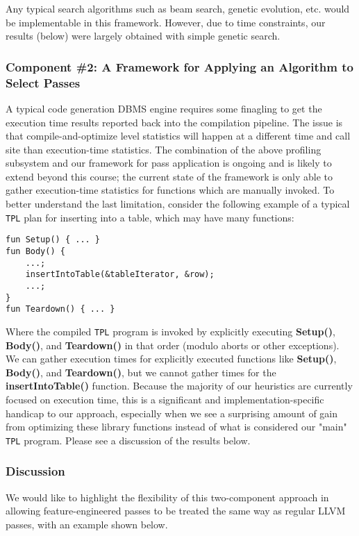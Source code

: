 \documentclass{vldb}
\newcommand{\tpl}{\texttt{TPL}\xspace}
\newcommand{\dbCode}[1]{{\sffamily\small \textbf{#1}}\xspace}
\begin{document}
Any typical search algorithms such as beam search, genetic evolution, etc. would be implementable in this framework. However, due to time constraints, our results (below) were largely obtained with simple genetic search.

\subsubsection{Component \#2: A Framework for Applying an Algorithm to Select Passes}

A typical code generation DBMS engine requires some finagling to get the execution time results reported back into the compilation pipeline. The issue is that compile-and-optimize level statistics will happen at a different time and call site than execution-time statistics. The combination of the above profiling subsystem and our framework for pass application is ongoing and is likely to extend beyond this course; the current state of the framework is only able to gather execution-time statistics for functions which are manually invoked. To better understand the last limitation, consider the following example of a typical \tpl plan for inserting into a table, which may have many functions:

\begin{lstlisting}
fun Setup() { ... }
fun Body() { 
    ...;
    insertIntoTable(&tableIterator, &row);
    ...;
}
fun Teardown() { ... }
\end{lstlisting}

Where the compiled \tpl program is invoked by explicitly executing \dbCode{Setup()}, \dbCode{Body()}, and \dbCode{Teardown()} in that order (modulo aborts or other exceptions). We can gather execution times for explicitly executed functions like \dbCode{Setup()}, \dbCode{Body()}, and \dbCode{Teardown()}, but we cannot gather times for the \dbCode{insertIntoTable()} function. Because the majority of our heuristics are currently focused on execution time, this is a significant and implementation-specific handicap to our approach, especially when we see a surprising amount of gain from optimizing these library functions instead of what is considered our "main" \tpl program. Please see a discussion of the results below.

\subsubsection{Discussion}

We would like to highlight the flexibility of this two-component approach in allowing feature-engineered passes to be treated the same way as regular LLVM passes, with an example shown below.
\end{document}
